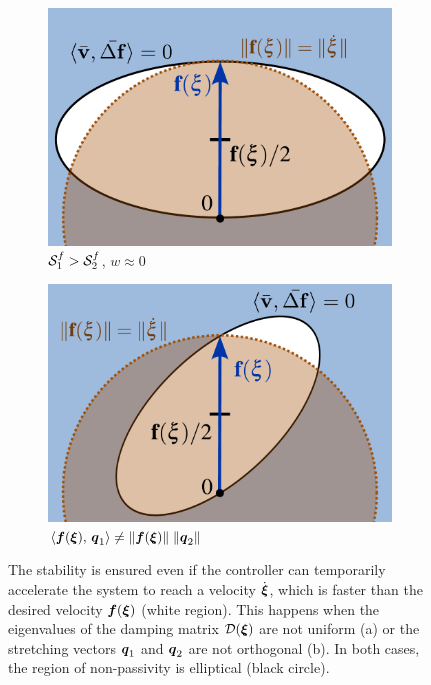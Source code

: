 \iflong
\begin{figure}[htbp]
    \centering
    \begin{subfigure}{0.49\columnwidth}
      \centerline{\includegraphics[width=\textwidth]{figures/passivity_analysis_wide}}
	  \caption{$\mathcal{S}_1^f > \mathcal{S}_2^f$, $w \approx 0$}
	  \label{fig:passivity_analysis_wide}
    \end{subfigure}\hfill%
    \begin{subfigure}{0.49\columnwidth}
    \includegraphics[width=\textwidth]{figures/passivity_analysis_skew}
	\caption{$\left\langle {\boldsymbol{f}(\boldsymbol{\xi})}, \, {\boldsymbol{q}_1} \right\rangle \neq \| \boldsymbol{f}(\boldsymbol{\xi})\| \; \| \boldsymbol{q}_2\| $ }
      \label{fig:passivity_analysis_skew}
    \end{subfigure}
	\caption{
		The stability is ensured even if the controller can temporarily accelerate the system  to reach a velocity $\dot{\boldsymbol{\xi}}$, which is faster than the desired velocity $\boldsymbol{f}(\boldsymbol{\xi})$ (white region).
		This happens when the eigenvalues of the damping matrix $\mathcal{D}(\boldsymbol{\xi})$ are not uniform (a) or the stretching vectors $\boldsymbol{q}_1$ and $\boldsymbol{q}_2$ are not orthogonal (b). 
	In both cases, the region of non-passivity is elliptical (black circle).
}
	\label{fig:passivity_analysis_varied}
\end{figure}
\fi


